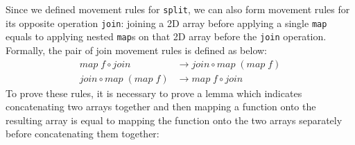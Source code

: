 \documentclass{l4proj}
\begin{document}
Since we defined movement rules for \texttt{split}, we can also form movement rules for its opposite operation \texttt{join}: joining a 2D array before applying a single \texttt{map} equals to applying nested \texttt{map}s on that 2D array before the \texttt{join} operation. Formally, the pair of join movement rules is defined as below:
\begin{align}
    \label{joinmove:1}
    map\; f \circ join &\to join \circ map\; (map\; f)\\
    \label{joinmove:2}
    join \circ map\; (map\; f) &\to map\; f \circ join
\end{align}
To prove these rules, it is necessary to prove a lemma which indicates concatenating two arrays together and then mapping a function onto the resulting array is equal to mapping the function onto the two arrays separately before concatenating them together:
\end{document}
